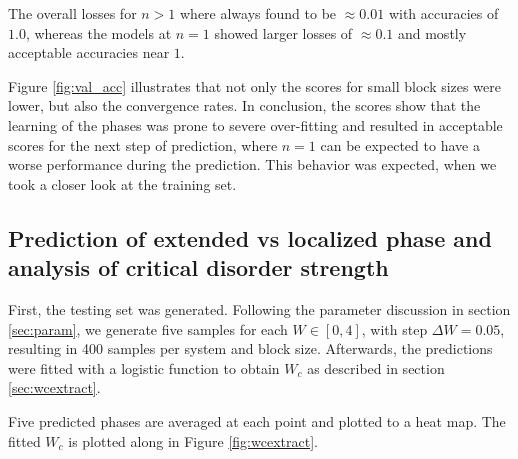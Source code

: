 \documentclass[reprint,amsmath,amssymb,aps,prb]{revtex4-2}
\begin{document}
The overall losses for $n>1$ where always found to be $\approx 0.01$ with accuracies of $1.0$, whereas the models at $n=1$ showed larger losses of  $\approx 0.1$ and mostly acceptable accuracies near $1$.%

Figure \ref{fig:val_acc} illustrates that not only the scores for small block sizes were lower, but also the convergence rates. In conclusion, the scores show that the learning of the phases was prone to severe over-fitting and resulted in acceptable scores for the next step of prediction, where $n=1$ can be expected to have a worse performance during the prediction. This behavior was expected, when we took a closer look at the training set.

\subsection{Prediction of extended vs localized phase and analysis of critical disorder strength}

First, the testing set was generated. Following the parameter discussion in section \ref{sec:param}, we generate five samples for each $W\in\left[0,4\right]$, with step $\Delta W=0.05$, resulting in 400 samples per system and block size. Afterwards, the predictions were fitted with a logistic function to obtain $W_c$ as described in section \ref{sec:wcextract}.

Five predicted phases are averaged at each point and plotted to a heat map. The fitted $W_c$ is plotted along in Figure \ref{fig:wcextract}.
\end{document}
